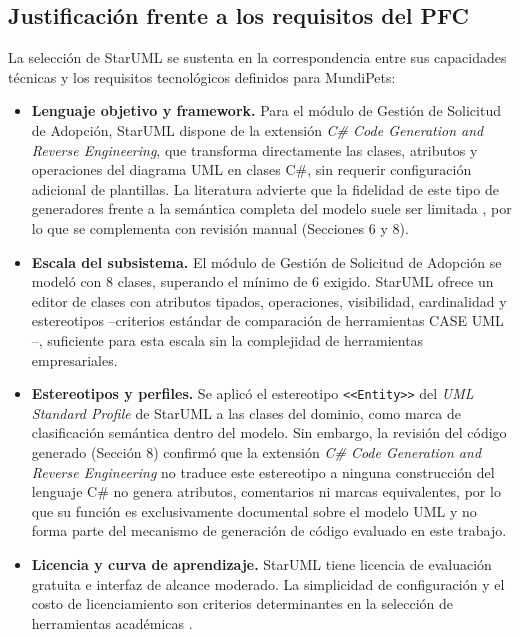 \documentclass[journal,onecolumn]{IEEEtran}
\begin{document}
\subsection{Justificación frente a los requisitos del PFC}
La selección de StarUML se sustenta en la correspondencia entre sus capacidades técnicas y los requisitos tecnológicos definidos para MundiPets:
\begin{itemize}[itemsep=2pt, topsep=2pt]
	\item \textbf{Lenguaje objetivo y framework.} Para el módulo de Gestión de Solicitud de Adopción, StarUML dispone de la extensión \textit{C\# Code Generation and Reverse Engineering}, que transforma directamente las clases, atributos y operaciones del diagrama UML en clases C\#, sin requerir configuración adicional de plantillas. La literatura advierte que la fidelidad de este tipo de generadores frente a la semántica completa del modelo suele ser limitada \cite{Sejans2011}, por lo que se complementa con revisión manual (Secciones 6 y 8).
	
	\item \textbf{Escala del subsistema.} El módulo de Gestión de Solicitud de Adopción se modeló con 8 clases, superando el mínimo de 6 exigido. StarUML ofrece un editor de clases con atributos tipados, operaciones, visibilidad, cardinalidad y estereotipos --criterios estándar de comparación de herramientas CASE UML \cite{Khaled2009}--, suficiente para esta escala sin la complejidad de herramientas empresariales.
	
	\item \textbf{Estereotipos y perfiles.} Se aplicó el estereotipo \texttt{\textless\textless{}Entity\textgreater\textgreater{}} del \textit{UML Standard Profile} de StarUML a las clases del dominio, como marca de clasificación semántica dentro del modelo. Sin embargo, la revisión del código generado (Sección 8) confirmó que la extensión \textit{C\# Code Generation and Reverse Engineering} no traduce este estereotipo a ninguna construcción del lenguaje C\# no genera atributos, comentarios ni marcas equivalentes, por lo que su función es exclusivamente documental sobre el modelo UML y no forma parte del mecanismo de generación de código evaluado en este trabajo.
	
	\item \textbf{Licencia y curva de aprendizaje.} StarUML tiene licencia de evaluación gratuita e interfaz de alcance moderado. La simplicidad de configuración y el costo de licenciamiento son criterios determinantes en la selección de herramientas académicas \cite{Khaled2009}.
\end{itemize}
\end{document}
